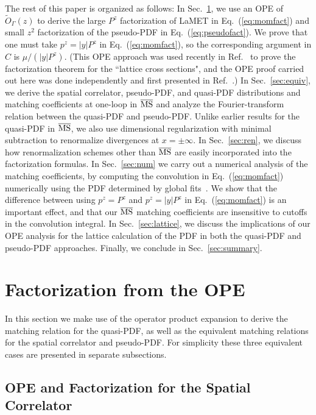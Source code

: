 \documentclass[prd,aps,twocolumn,preprintnumbers,showpacs,nofootinbib,superscriptaddress,notitlepage]{revtex4-1}
\newcommand{\spcorr}{spatial correlator\xspace}
\DeclareRobustCommand{\eq}[1]{Eq.~(\ref{eq:#1})}
\begin{document}
The rest of this paper is organized as follows: In Sec.~\ref{sec:ope}, we use an OPE of $\tilde{O}_\Gamma(z)$ to derive the large $P^z$ factorization of LaMET in Eq.~(\ref{eq:momfact}) and small $z^2$ factorization of the pseudo-PDF in Eq.~(\ref{eq:pseudofact}). We prove that one must take $p^z=|y|P^z$ in \eq{momfact}, so the corresponding argument in $C$ is $\mu/(|y|P^z)$.
(This OPE approach was used recently in Ref.~\cite{Ma:2017pxb} to prove the factorization theorem for the ``lattice cross sections", and the OPE proof carried out here was done independently and first presented in Ref.~\cite{Zhao:2017int}.)
%
In Sec.~\ref{sec:equiv}, we derive the \spcorr, pseudo-PDF, and quasi-PDF distributions and matching coefficients at one-loop in $\overline{\rm MS}$ and analyze the Fourier-transform relation between the quasi-PDF and pseudo-PDF. Unlike earlier results for the quasi-PDF in $\overline{\rm MS}$, we also use dimensional regularization with minimal subtraction to renormalize divergences at $x=\pm\infty$. In Sec.~\ref{sec:ren}, we discuss how renormalization schemes other than $\overline{\rm MS}$ are easily incorporated into the factorization formulas.
%
In Sec.~\ref{sec:num} we carry out a numerical analysis of the matching coefficients, by computing the convolution in Eq.~(\ref{eq:momfact}) numerically using the PDF determined by global fits~\cite{Martin:2009iq}. We show that the difference between using $p^z=P^z$ and $p^z=|y|P^z$ in \eq{momfact} is an important effect, and that our $\overline{\rm MS}$ matching coefficients are insensitive to cutoffs in the convolution integral. In Sec.~\ref{sec:lattice}, we discuss the implications of our OPE analysis for the lattice calculation of the PDF in both the quasi-PDF and pseudo-PDF approaches. Finally, we conclude in Sec.~\ref{sec:summary}.

\section{Factorization from the OPE}
\label{sec:ope}

In this section we make use of the operator product expansion to derive the matching relation for the quasi-PDF, as well as the equivalent matching relations for the \spcorr and pseudo-PDF. For simplicity these three equivalent cases are presented in separate subsections.
 
\subsection{OPE and Factorization for the Spatial Correlator}
\end{document}
